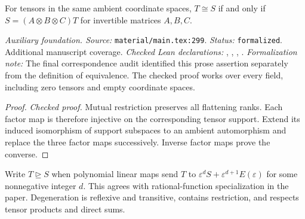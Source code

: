 \renewcommand{\thetheorem}{A2}
\begin{lemma}
\label{aux:invertible-tensor-equivalence}
\leanok
For tensors in the same ambient coordinate spaces, $T\cong S$ if and only if $S=(A\otimes B\otimes C)T$ for invertible matrices $A,B,C$.
\end{lemma}

\noindent\textit{Auxiliary foundation. Source:} \texttt{material/main.tex:299}.
\textit{Status:} \texttt{formalized}. Additional manuscript coverage.
\textit{Checked Lean declarations:} , , , .
\textit{Formalization note:} The final correspondence audit identified this prose assertion separately from the definition of equivalence. The checked proof works over every field, including zero tensors and empty coordinate spaces.

\begin{proof}
\leanok
{}
\textit{Checked proof.} Mutual restriction preserves all flattening ranks. Each factor map is therefore injective on the corresponding tensor support. Extend its induced isomorphism of support subspaces to an ambient automorphism and replace the three factor maps successively. Inverse factor maps prove the converse.
\end{proof}

\renewcommand{\thetheorem}{A3}
\begin{definition}
\label{aux:degeneration-calculus}
\leanok
Write $T\trianglerighteq S$ when polynomial linear maps send $T$ to $\varepsilon^dS+\varepsilon^{d+1}E(\varepsilon)$ for some nonnegative integer $d$. This agrees with rational-function specialization in the paper. Degeneration is reflexive and transitive, contains restriction, and respects tensor products and direct sums.
\end{definition}


